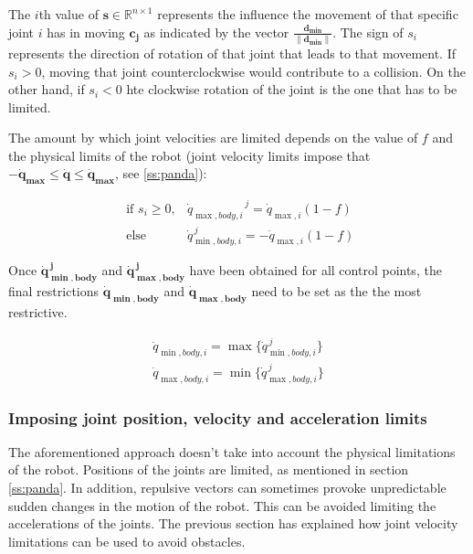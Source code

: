 The $i$th value of $\mathbf{s} \in \mathbb{R}^{n \times 1}$ represents the influence the movement of that specific joint $i$ has in moving $\mathbf{c_{j}}$ as indicated by the vector $\frac{\mathbf{d_{min}}}{\|\mathbf{d_{min}}\|}$. The sign of $s_i$ represents the direction of rotation of that joint that leads to that movement. If $s_i > 0$, moving that joint counterclockwise would contribute to a collision. On the other hand, if $s_i < 0$ hte clockwise rotation of the joint is the one that has to be limited.

The amount by which joint velocities are limited depends on the value of $f$ and the physical limits of the robot (joint velocity limits impose that $-\mathbf{\dot{q}_{\max}} \leq \mathbf{\dot{q}} \leq \mathbf{\dot{q}_{\max}}$, see \ref{ss:panda}):


\begin{equation*}
    \begin{array}{ll}
        \text { if } s_{i} \geq 0, & {\dot{q}_{\max, body , i}}^{\, j}=\dot{q}_{\max, i}\left.\left(1-f\right)\right. \\
        \text { else } & \dot{q}_{\min, body , i}^{\, j}=-\dot{q}_{\max, i}\left.\left(1-f\right)\right.
    \end{array}
\end{equation*}

Once $\mathbf{\dot{q}_{\min, body}^{\, j}}$ and $\mathbf{\dot{q}_{\max, body}^{\, j}}$ have been obtained for all control points, the final restrictions $\mathbf{\dot{q}_{\min, body}}$ and $\mathbf{\dot{q}_{\max, body}}$ need to be set as the the most restrictive.

\begin{equation*}
    \begin{array}{l}
        \dot{q}_{\min, body , i} = \max \{\dot{q}_{\min, body , i}^{\, j}\} \\
        \dot{q}_{\max, body , i} = \min \{\dot{q}_{\max, body , i}^{\, j}\}
    \end{array}
\end{equation*}

\subsubsection{Imposing joint position, velocity and acceleration limits}
\label{sss:flaccobody}

The aforementioned approach doesn't take into account the physical limitations of the robot. Positions of the joints are limited, as mentioned in section \ref{ss:panda}. In addition, repulsive vectors can sometimes provoke unpredictable sudden changes in the motion of the robot. This can be avoided limiting the accelerations of the joints. The previous section has explained how joint velocity limitations can be used to avoid obstacles.

